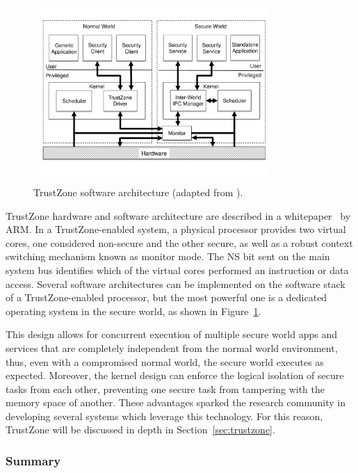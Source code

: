 \begin{figure}[t!]
	\centering
	\includegraphics[width=0.80\textwidth]{img/trustzone.pdf}
	\caption{TrustZone software architecture (adapted from \cite{trustzone_whitepaper}).}
	\label{fig:trustzone_architecture}
\end{figure}

TrustZone hardware and software architecture are described in a whitepaper~\cite{trustzone_whitepaper} by ARM. In a TrustZone-enabled system, a physical processor provides two virtual cores, one considered non-secure and the other secure, as well as a robust context switching mechanism known as monitor mode. The NS bit sent on the main system bus identifies which of the virtual cores performed an instruction or data access. Several software architectures can be implemented on the software stack of a TrustZone-enabled processor, but the most powerful one is a dedicated operating system in the secure world, as shown in Figure~\ref{fig:trustzone_architecture}.

This design allows for concurrent execution of multiple secure world apps and services that are completely independent from the normal world environment, thus, even with a compromised normal world, the secure world executes as expected. Moreover, the kernel design can enforce the logical isolation of secure tasks from each other, preventing one secure task from tampering with the memory space of another. These advantages sparked the research community in developing several systems which leverage this technology. For this reason, TrustZone will be discussed in depth in Section~\ref{sec:trustzone}.

\subsubsection{Summary}


